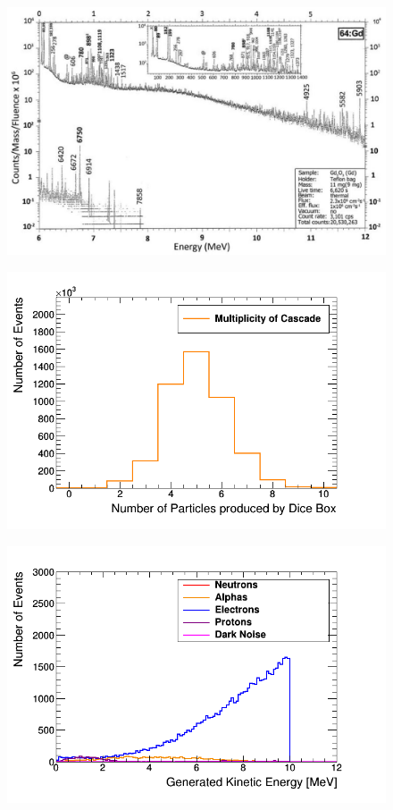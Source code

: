 \begin{figure}[H]
 \centering
 \includegraphics[width=0.7\linewidth]{Chapter4/Figs/Raster/gadolinium/naturalGd.png}
 \label{fig:naturalGd.png}
\end{figure}

\begin{figure}[H]
 \centering
 \includegraphics[width=0.7\linewidth]{Chapter4/Figs/Raster/gadolinium/multiplicityOfCascadeGd.png}
 \label{fig:multiplicityOfCascadeGd}
\end{figure}

\begin{figure}[H]
 \centering
 \includegraphics[width=0.7\linewidth]{Chapter4/Figs/Raster/gadolinium/GeneratedEnergyPastTriggerGdDicebox.png}
 \label{fig:GeneratedEnergyPastTriggerGdDicebox}
\end{figure}

